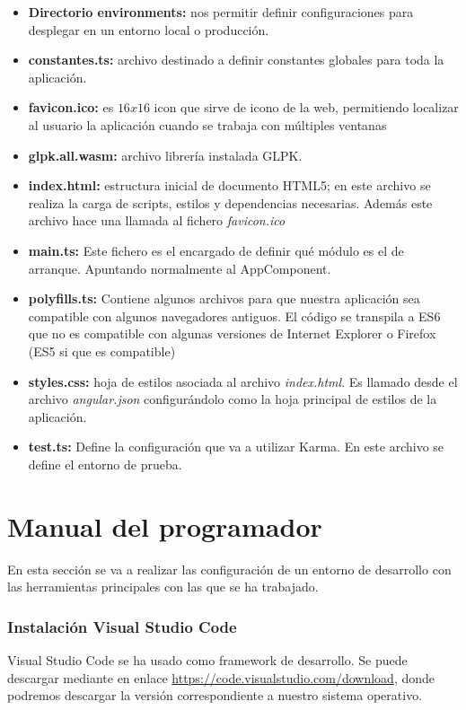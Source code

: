 \begin{itemize}
    
    \item \textbf{Directorio environments:} nos permitir definir configuraciones para desplegar en un entorno local o producción.
    \item \textbf{constantes.ts:} archivo destinado a definir constantes globales para toda la aplicación.
    \item \textbf{favicon.ico:} es $16x16$ icon que sirve de icono de la web, permitiendo localizar al usuario la aplicación cuando se trabaja con múltiples ventanas
    \item \textbf{glpk.all.wasm:} archivo librería instalada GLPK.
    \item \textbf{index.html:} estructura inicial de documento HTML5; en este archivo se realiza la carga de scripts, estilos y dependencias necesarias. Además este archivo hace una llamada al fichero \textit{favicon.ico}
    \item \textbf{main.ts:} Este fichero es el encargado de definir qué módulo es el de arranque. Apuntando normalmente al AppComponent.
    \item \textbf{polyfills.ts:} Contiene algunos archivos para que nuestra aplicación sea compatible con algunos navegadores antiguos. El código se transpila a ES6 que no es compatible con algunas versiones de Internet Explorer o Firefox (ES5 si que es compatible) 
    \item \textbf{styles.css:} hoja de estilos asociada al archivo \textit{index.html}. Es llamado desde el archivo \textit{angular.json} configurándolo como la hoja principal de estilos de la aplicación.
    \item \textbf{test.ts:} Define la configuración que va a utilizar Karma. En este archivo se define el entorno de prueba.
\end{itemize}

\section{Manual del programador}

En esta sección se va a realizar las configuración de un entorno de desarrollo con las herramientas principales con las que se ha trabajado.

\subsubsection{Instalación Visual Studio Code}

Visual Studio Code se ha usado como framework de desarrollo. Se puede descargar mediante en enlace \url{https://code.visualstudio.com/download}, donde podremos descargar la versión correspondiente a nuestro sistema operativo.


